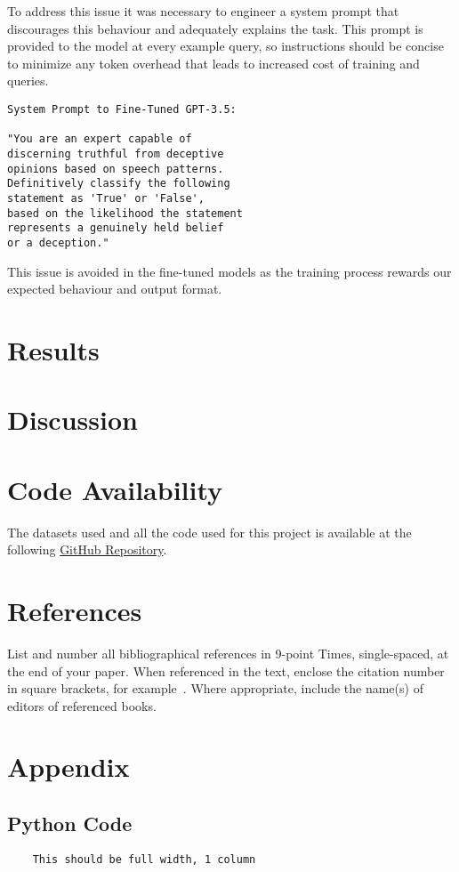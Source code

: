 \documentclass[10pt,twocolumn,letterpaper]{article}
\begin{document}
To address this issue it was necessary to engineer a system prompt that
discourages this behaviour and adequately explains the task. This prompt
is provided to the model at every example query, so instructions should
be concise to minimize any token overhead that leads to increased cost of
training and queries.

\begin{verbatim}
System Prompt to Fine-Tuned GPT-3.5:

"You are an expert capable of
discerning truthful from deceptive
opinions based on speech patterns. 
Definitively classify the following 
statement as 'True' or 'False', 
based on the likelihood the statement
represents a genuinely held belief 
or a deception."
\end{verbatim}

This issue is avoided in the fine-tuned models as the training process
rewards our expected behaviour and output format.



\section{Results}

\section{Discussion}

\section{Code Availability}
The datasets used and all the code used for this project is available
at the following \href{https://github.com/TannerAGraves/GPT-LieDetection/}{GitHub Repository}.


\section{References}

List and number all bibliographical references in 9-point Times,
single-spaced, at the end of your paper. When referenced in the text,
enclose the citation number in square brackets, for
example~\cite{Loconte}.  Where appropriate, include the name(s) of
editors of referenced books.

{\small


}


\section{Appendix}
 
\subsection{Python Code}

\begin{verbatim}
    This should be full width, 1 column
\end{verbatim}
\end{document}

